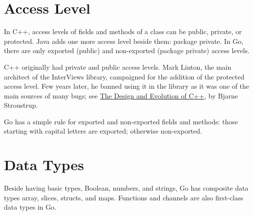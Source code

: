 \documentclass[11pt]{article}
\begin{document}
\section*{Access Level}
\label{sec:orgheadline15}
In C++, access levels of fields and methods of a class can be public, private, or protected. Java adds one more access level beside them: package private. In Go, there are only exported (public) and non-exported (package private) access levels.

C++ originally had private and public access levels. Mark Linton, the main architect of the InterViews library, campaigned for the addition of the protected access level. Few years later, he banned using it in the library as it was one of the main sources of many bugs; see \href{http://www.stroustrup.com/dne.html}{The Design and Evolution of C++}, by Bjarne Stroustrup.

Go has a simple rule for exported and non-exported fields and methods: those starting with capital letters are exported; otherwise non-exported.

\section*{Data Types}
\label{sec:orgheadline18}
Beside having basic types, Boolean, numbers, and strings, Go has composite data types array, slices, structs, and maps. Functions and channels are also first-class data types in Go.
\end{document}
